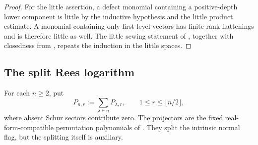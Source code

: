 \documentclass[10pt,reqno]{amsart}
\theoremstyle{plain}
\theoremstyle{definition}
\theoremstyle{remark}
\begin{document}
\begin{proof}
For the little assertion, a defect monomial containing a positive-depth
lower component is little by the inductive hypothesis and the little
product estimate.  A monomial containing only first-level vectors has
finite-rank flattenings and is therefore little as well.  The little
sewing statement of , together with
closedness from , repeats the induction
in the little spaces.
\end{proof}

\subsection{The split Rees logarithm}
\label{cc:subsec-split-rees-logarithm}

For each \(n\ge2\), put
\[
 P_{n,r}:=\sum_{\lambda\vdash n}P_{\lambda,r},
 \qquad 1\le r\le\lfloor n/2\rfloor,
\]
where absent Schur sectors contribute zero.  The projectors are the fixed
real-form-compatible permutation polynomials of
.  They split the intrinsic normal flag,
but the splitting itself is auxiliary.
\end{document}
